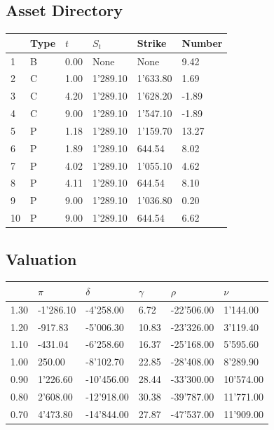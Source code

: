 \documentclass[12pt]{article}
\begin{document}
\begin{center} 
 \section{Asset Directory} 
 \par 
 \begin{scriptsize} 
 \begin{tabular}{p{17.5 mm}|p{17.5 mm}|p{17.5 mm}|p{17.5 mm}|p{17.5 mm}|p{17.5 mm}} 
          &     Type &      $t$ &    $S_t$ &   Strike &   Number \\ \hline 
1 & B& 0.00& None& None& 9.42\\ 
2 & C& 1.00& 1'289.10& 1'633.80& 1.69\\ 
3 & C& 4.20& 1'289.10& 1'628.20& -1.89\\ 
4 & C& 9.00& 1'289.10& 1'547.10& -1.89\\ 
5 & P& 1.18& 1'289.10& 1'159.70& 13.27\\ 
6 & P& 1.89& 1'289.10& 644.54& 8.02\\ 
7 & P& 4.02& 1'289.10& 1'055.10& 4.62\\ 
8 & P& 4.11& 1'289.10& 644.54& 8.10\\ 
9 & P& 9.00& 1'289.10& 1'036.80& 0.20\\ 
10 & P& 9.00& 1'289.10& 644.54& 6.62\\ 
\end{tabular} 
  \end{scriptsize} 
 \end{center}%
\begin{center} 
 \section{Valuation} 
 \par 
 \begin{scriptsize} 
 \begin{tabular}{p{17.5 mm}|p{17.5 mm}|p{17.5 mm}|p{17.5 mm}|p{17.5 mm}|p{17.5 mm}} 
          &    $\pi$ & $\delta$ & $\gamma$ &   $\rho$ &    $\nu$ \\ \hline 
  1.30 & -1'286.10& -4'258.00& 6.72& -22'506.00& 1'144.00\\ 
  1.20 & -917.83& -5'006.30& 10.83& -23'326.00& 3'119.40\\ 
  1.10 & -431.04& -6'258.60& 16.37& -25'168.00& 5'595.60\\ 
  1.00 & 250.00& -8'102.70& 22.85& -28'408.00& 8'289.90\\ 
  0.90 & 1'226.60& -10'456.00& 28.44& -33'300.00& 10'574.00\\ 
  0.80 & 2'608.00& -12'918.00& 30.38& -39'787.00& 11'771.00\\ 
  0.70 & 4'473.80& -14'844.00& 27.87& -47'537.00& 11'909.00\\ 
\end{tabular} 
  \end{scriptsize} 
 \end{center}%
\end{document}
